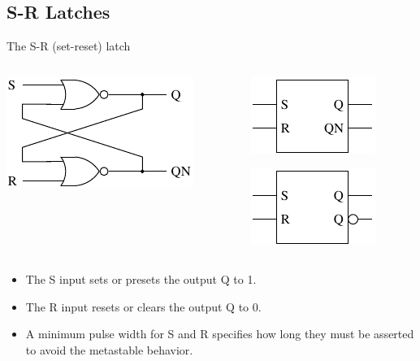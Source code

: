 \subsection{S-R Latches}

\begin{frame}{The S-R (set-reset) latch}
  \begin{columns}
    \begin{column}{6cm}
      \begin{center}
        \includegraphics{SRLatchCircuit}
      \end{center}
    \end{column}
    \begin{column}{6cm}
      \begin{center}
        \includegraphics{SRLatchSchematicActiveHigh} \\
      \end{center}
      \begin{center}
        \includegraphics{SRLatchSchematicActiveLow} \\
      \end{center}
    \end{column}
  \end{columns}
  \begin{itemize}
    \item The S input sets or presets the output Q to 1.
    \item The R input resets or clears the output Q to 0.
    \item A \alert{minimum pulse width} for S and R specifies how long they must be asserted to avoid the metastable behavior.
  \end{itemize}
\end{frame}

